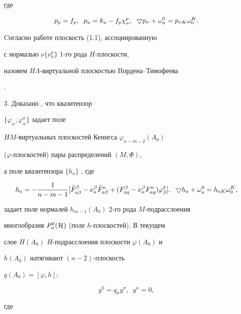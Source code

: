 где


$$


p_p = f_p,\ \;


p_u = k_u - f_p \chi^p_u,\ \;


\bgd p_\sigma + \omega^0_\sigma =


p_{\sigma K} \omega^K_0.


$$


Cогласно работе \cite{rab5} плоскость (1.1), ассоциированную


с нормалью $\nu \{ \nu^\sigma_n\}$ 1-го рода $H$-плоскости,


назовем $H\Lambda$-виртуальной плоскостью Hордена--Тимофеева


\cite{rab6}.





3. Доказано \cite{rab3}, что квазитензор


$\{ \varphi_\alpha, \varphi^a_\alpha\}$ задает поле


$HM$-виртуальных плоскостей Кенигса $\varphi_{n-m-2}(A_0)$


($\varphi$-плоскостей) пары распределений $(M,\Phi)$,


а поле квазитензора $\{ h_a\}$ \cite{rab3}, где


$$


h_a= -\frac1{n-m-1}


[ {\widetilde F}^\beta_{a\beta} - 


\nu^\beta_n {\widetilde F}^n_{a \beta} +


(F^\beta_{aq} - \nu^\beta_n F^n_{aq})\varphi^q_\beta ],\ \;


\bgd h_a + \omega^0_a = h_{aK} \omega^K_0,


$$


задает поле нормалей $h_{m-1}(A_0)$ 2-го рода $M$-подрасслоения


многообразия $P^0_n(\cal H)$ (поле $h$-плоскостей). В текущем


слое $H(A_0)$\; $H$-подрасслоения плоскости $\varphi (A_0)$ и


$h(A_0)$ натягивают $(n-2)$-плоскость


$q(A_0)=[\varphi, h]$:


\begin{equation}


y^0=q_\sigma y^\sigma,\ \; y^n=0,


\end{equation}


где


$$


